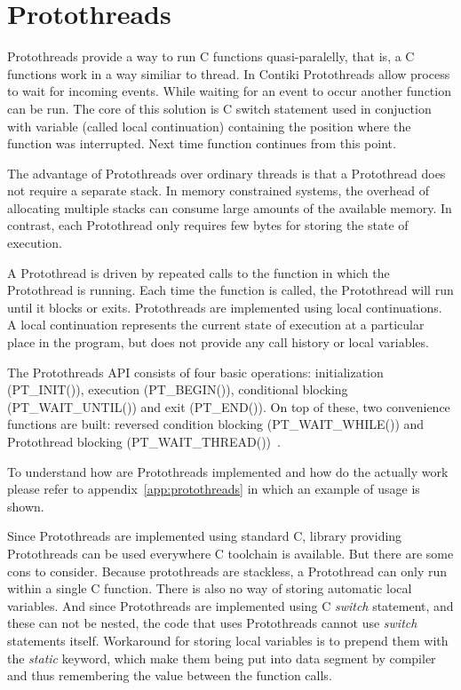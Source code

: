 
\section{Protothreads}\label{sec:contiki-protothreads}
Protothreads provide a way to run C functions quasi-paralelly, that is, a C functions work in a way similiar to thread.
In Contiki Protothreads allow process to wait for incoming events. While waiting for an event to occur another function
can be run. The core of this solution is C switch statement used in conjuction with variable (called local continuation)
containing the position where the function was interrupted. Next time function continues from this point.

The advantage of Protothreads over ordinary threads is that a Protothread does not require a separate stack.
In memory constrained systems, the overhead of allocating multiple stacks can consume large amounts of
the available memory. In contrast, each Protothread only requires few bytes for storing the state of execution.

A Protothread is driven by repeated calls to the function in which the Protothread is running.
Each time the
function is called, the Protothread will run until it blocks or exits.
Protothreads are implemented using local continuations. A local continuation represents the current state
of execution at a particular place in the program, but does not provide any call history or local variables.

The Protothreads API consists of four basic operations: initialization (PT\_INIT()), execution (PT\_BEGIN()),
conditional blocking (PT\_WAIT\_UNTIL()) and exit (PT\_END()). On top of these, two convenience functions
are built: reversed condition blocking (PT\_WAIT\_WHILE()) and Protothread blocking (PT\_WAIT\_THREAD())~\cite{paper-protothreads}.

To understand how are Protothreads implemented and how do the actually work please refer
to appendix~\ref{app:protothreads} in which an example of usage is shown.

Since Protothreads are implemented using standard C, library providing Protothreads can be used everywhere C toolchain is available.
But there are some cons to consider. Because protothreads are stackless, a Protothread can only run within a single C function.
There is also no way of storing automatic local variables. And since Protothreads are implemented using C {\it switch} statement, and these can
not be nested, the code that uses Protothreads cannot use {\it switch} statements itself.
Workaround for storing local variables is to prepend them with the {\it static} keyword, which make them being put into data segment
by compiler and thus remembering the value between the function calls.
